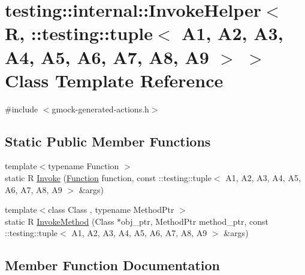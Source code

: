 \hypertarget{classtesting_1_1internal_1_1_invoke_helper_3_01_r_00_01_1_1testing_1_1tuple_3_01_a1_00_01_a2_00_cb3e0694d0722fcc616ae618dc383e5b}{}\section{testing\+::internal\+::Invoke\+Helper$<$ R, \+::testing\+::tuple$<$ A1, A2, A3, A4, A5, A6, A7, A8, A9 $>$ $>$ Class Template Reference}
\label{classtesting_1_1internal_1_1_invoke_helper_3_01_r_00_01_1_1testing_1_1tuple_3_01_a1_00_01_a2_00_cb3e0694d0722fcc616ae618dc383e5b}


{\ttfamily \#include $<$gmock-\/generated-\/actions.\+h$>$}

\subsection*{Static Public Member Functions}
\begin{DoxyCompactItemize}
\item 
{\footnotesize template$<$typename Function $>$ }\\static R \mbox{\hyperlink{classtesting_1_1internal_1_1_invoke_helper_3_01_r_00_01_1_1testing_1_1tuple_3_01_a1_00_01_a2_00_cb3e0694d0722fcc616ae618dc383e5b_afd0d2a5a81d947b5b11dc2ede6e49a0e}{Invoke}} (\mbox{\hyperlink{structtesting_1_1internal_1_1_function}{Function}} function, const \+::testing\+::tuple$<$ A1, A2, A3, A4, A5, A6, A7, A8, A9 $>$ \&args)
\item 
{\footnotesize template$<$class Class , typename Method\+Ptr $>$ }\\static R \mbox{\hyperlink{classtesting_1_1internal_1_1_invoke_helper_3_01_r_00_01_1_1testing_1_1tuple_3_01_a1_00_01_a2_00_cb3e0694d0722fcc616ae618dc383e5b_ab468cf4a3e1ff2fa33a60ce3459c17f7}{Invoke\+Method}} (Class $\ast$obj\+\_\+ptr, Method\+Ptr method\+\_\+ptr, const \+::testing\+::tuple$<$ A1, A2, A3, A4, A5, A6, A7, A8, A9 $>$ \&args)
\end{DoxyCompactItemize}


\subsection{Member Function Documentation}
\mbox{\label{classtesting_1_1internal_1_1_invoke_helper_3_01_r_00_01_1_1testing_1_1tuple_3_01_a1_00_01_a2_00_cb3e0694d0722fcc616ae618dc383e5b_afd0d2a5a81d947b5b11dc2ede6e49a0e}} 
